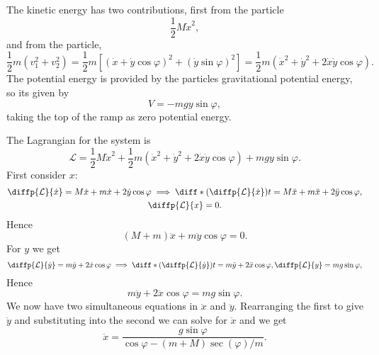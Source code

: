 \documentclass[fleqn]{NotesClass}
\newcommand*{\lagrangian}{\mathcal{L}}
\begin{document}
    The kinetic energy has two contributions, first from the particle
    \begin{equation}
        \frac{1}{2}M\dot{x}^2,
    \end{equation}
    and from the particle,
    \begin{equation}
        \frac{1}{2}m(v_1^2 + v_2^2) = \frac{1}{2}m[(\dot{x} + \dot{y}\cos\varphi)^2 + (\dot{y}\sin\varphi)^2] = \frac{1}{2}m(\dot{x}^2 + \dot{y}^2 + 2\dot{x}\dot{y}\cos\varphi).
    \end{equation}
    The potential energy is provided by the particles gravitational potential energy, so its given by
    \begin{equation}
        V = -mgy\sin\varphi,
    \end{equation}
    taking the top of the ramp as zero potential energy.
    
    The Lagrangian for the system is
    \begin{equation}
        \lagrangian = \frac{1}{2}M\dot{x}^2 + \frac{1}{2}m(\dot{x}^2 + \dot{y}^2 + 2\dot{x}\dot{y}\cos\varphi) + mgy\sin\varphi.
    \end{equation}
    First consider \(x\):
    \begin{gather}
        \diffp{\lagrangian}{\dot{x}} = M\dot{x} + m\dot{x} + 2\dot{y}\cos\varphi \implies \diff*{\left( \diffp{\lagrangian}{\dot{x}} \right)}{t} = M\ddot{x} + m\ddot{x} + 2\ddot{y}\cos\varphi,\\
        \diffp{\lagrangian}{x} = 0.
    \end{gather}
    Hence
    \begin{equation}
        (M + m)\ddot{x} +m\ddot{y}\cos\varphi = 0.
    \end{equation}
    For \(y\) we get
    \begin{equation}
        \diffp{\lagrangian}{\dot{y}} = m\dot{y} + 2\dot{x}\cos\varphi \implies \diff*{\left( \diffp{\lagrangian}{\dot{y}} \right)}{t} = m\ddot{y} + 2\ddot{x}\cos\varphi,\\
        \diffp{\lagrangian}{y} = mg\sin\varphi,
    \end{equation}
    Hence
    \begin{equation}
        m\ddot{y} + 2\ddot{x}\cos\varphi = mg\sin\varphi.
    \end{equation}
    We now have two simultaneous equations in \(\ddot{x}\) and \(\ddot{y}\).
    Rearranging the first to give \(\ddot{y}\) and substituting into the second we can solve for \(\ddot{x}\) and we get
    \begin{equation}
        \ddot{x} = \frac{g\sin\varphi}{\cos\varphi - (m + M)\sec(\varphi)/m}.
    \end{equation}
    
\end{document}

